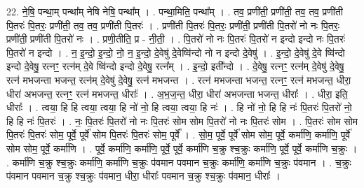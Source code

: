 \documentclass[17pt]{extarticle}
\begin{document}
22. ने॒षि॒ पन्था॒म् पन्था᳚म् नेषि नेषि॒ पन्था᳚म् । . पन्था॒मिति॒ पन्था᳚म् । . तव॒ प्रणी॑ती॒ प्रणी॑ती॒ तव॒ तव॒ प्रणी॑ती पि॒तरः॑ पि॒तरः॒ प्रणी॑ती॒ तव॒ तव॒ प्रणी॑ती पि॒तरः॑ । . प्रणी॑ती पि॒तरः॑ पि॒तरः॒ प्रणी॑ती॒ प्रणी॑ती पि॒तरो॑ नो नः पि॒तरः॒ प्रणी॑ती॒ प्रणी॑ती पि॒तरो॑ नः । . प्रणी॒तीति॒ प्र - नी॒ती॒ । . पि॒तरो॑ नो नः पि॒तरः॑ पि॒तरो॑ न इन्दो इन्दो नः पि॒तरः॑ पि॒तरो॑ न इन्दो । . न॒ इ॒न्दो॒ इ॒न्दो॒ नो॒ न॒ इ॒न्दो॒ दे॒वेषु॑ दे॒वेष्वि॑न्दो नो न इन्दो दे॒वेषु॑ । . इ॒न्दो॒ दे॒वेषु॑ दे॒वे ष्वि॑न्दो इन्दो दे॒वेषु॒ रत्नꣳ॒॒ रत्न॑म् दे॒वे ष्वि॑न्दो इन्दो दे॒वेषु॒ रत्न᳚म् । . इ॒न्दो॒ इती᳚न्दो । . दे॒वेषु॒ रत्नꣳ॒॒ रत्न॑म् दे॒वेषु॑ दे॒वेषु॒ रत्न॑ मभजन्ता भजन्त॒ रत्न॑म् दे॒वेषु॑ दे॒वेषु॒ रत्न॑ मभजन्त । . रत्न॑ मभजन्ता भजन्त॒ रत्नꣳ॒॒ रत्न॑ मभजन्त॒ धीरा॒ धीरा॑ अभजन्त॒ रत्नꣳ॒॒ रत्न॑ मभजन्त॒ धीराः᳚ । . अ॒भ॒ज॒न्त॒ धीरा॒ धीरा॑ अभजन्ता भजन्त॒ धीराः᳚ । . धीरा॒ इति॒ धीराः᳚ । . त्वया॒ हि हि त्वया॒ त्वया॒ हि नो॑ नो॒ हि त्वया॒ त्वया॒ हि नः॑ । . हि नो॑ नो॒ हि हि नः॑ पि॒तरः॑ पि॒तरो॑ नो॒ हि हि नः॑ पि॒तरः॑ । . नः॒ पि॒तरः॑ पि॒तरो॑ नो नः पि॒तरः॑ सोम सोम पि॒तरो॑ नो नः पि॒तरः॑ सोम । . पि॒तरः॑ सोम सोम पि॒तरः॑ पि॒तरः॑ सोम॒ पूर्वे॒ पूर्वे॑ सोम पि॒तरः॑ पि॒तरः॑ सोम॒ पूर्वे᳚ । . सो॒म॒ पूर्वे॒ पूर्वे॑ सोम सोम॒ पूर्वे॒ कर्मा॑णि॒ कर्मा॑णि॒ पूर्वे॑ सोम सोम॒ पूर्वे॒ कर्मा॑णि । . पूर्वे॒ कर्मा॑णि॒ कर्मा॑णि॒ पूर्वे॒ पूर्वे॒ कर्मा॑णि च॒क्रु श्च॒क्रुः कर्मा॑णि॒ पूर्वे॒ पूर्वे॒ कर्मा॑णि च॒क्रुः । . कर्मा॑णि च॒क्रु श्च॒क्रुः कर्मा॑णि॒ कर्मा॑णि च॒क्रुः प॑वमान पवमान च॒क्रुः कर्मा॑णि॒ कर्मा॑णि च॒क्रुः प॑वमान । . च॒क्रुः प॑वमान पवमान च॒क्रु श्च॒क्रुः प॑वमान॒ धीरा॒ धीराः᳚ पवमान च॒क्रु श्च॒क्रुः प॑वमान॒ धीराः᳚ । \newline
\end{document}
